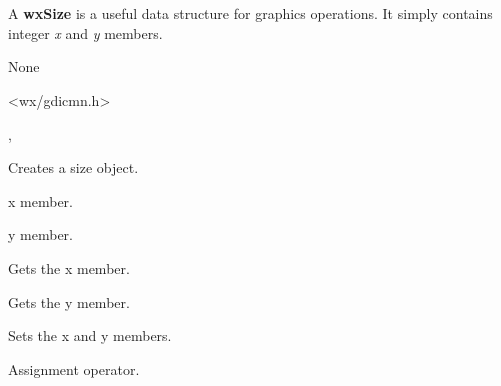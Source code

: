 \section{}\label{wxsize}

A {\bf wxSize} is a useful data structure for graphics operations.
It simply contains integer {\it x} and {\it y} members.


None


<wx/gdicmn.h>


, 





Creates a size object.



x member.



y member.

\label{wxsizegetx}


Gets the x member.

\label{wxsizegety}


Gets the y member.

\label{wxsizeset}


Sets the x and y members.



Assignment operator.


